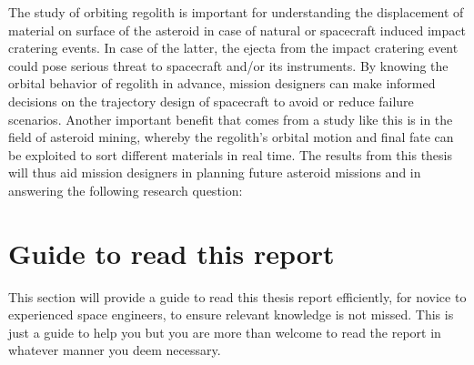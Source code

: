 %
\newline\newline
%
The study of orbiting regolith is important for understanding the displacement of material on surface of the asteroid in case of natural or spacecraft induced impact cratering events. In case of the latter, the ejecta from the impact cratering event could pose serious threat to spacecraft and/or its instruments. By knowing the orbital behavior of regolith in advance, mission designers can make informed decisions on the trajectory design of spacecraft to avoid or reduce failure scenarios. Another important benefit that comes from a study like this is in the field of asteroid mining, whereby the regolith's orbital motion and final fate can be exploited to sort different materials in real time. The results from this thesis will thus aid mission designers in planning future asteroid missions and in answering the following research question:
\vspace{5mm}
\begin{center}
\end{center}
\vspace{5mm}
\section{Guide to read this report}
\label{sec:report_reading_guide}
This section will provide a guide to read this thesis report efficiently, for novice to experienced space engineers, to ensure relevant knowledge is not missed. This is just a guide to help you but you are more than welcome to read the report in whatever manner you deem necessary.


